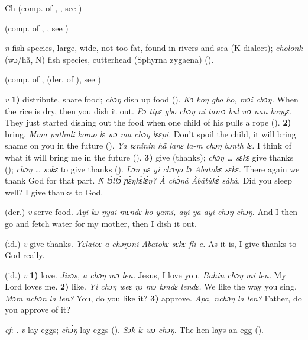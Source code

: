 \begin{letter}{Ch}
 (comp. of , , see ) 

 (comp. of , , see )

 \textit{n} fish species, large, wide, not too fat, found in rivers and sea (K dialect); \textit{cholonk} (wɔ/hã, N) fish species, cutterhead (Sphyrna zygaena) (\citealt{Pichl1967}). 

 (comp. of ,  (der. of ), see ) 

 \textit{v} \textbf{1)} distribute, share food; \textit{chɔŋ} dish up food (\citealt{Pichl1967}). \textit{Kɔ koŋ gbo ho, mɔi chɔŋ.} When the rice is dry, then you dish it out. \textit{Pɔ tipɛ gbo chɔŋ ni tamɔ bul wɔ nan baŋgɛ.} They just started dishing out the food when one child of his pulls a rope (\citealt{Sumner1921}). \textbf{2)} bring. \textit{Mma puthuli komo lɛ wɔ ma chɔŋ lɛɛpi.} Don't spoil the child, it will bring shame on you in the future (\citealt{Pichl1967}). \textit{Ya tɛninin hã lanɛ la-m chɔŋ bɔnth lɛ.} I think of what it will bring me in the future (\citealt{Pichl1967}). \textbf{3)} give (thanks);  \textit{chɔŋ … sɛkɛ} give thanks  (\citealt{Pichl1967}); \textit{chɔŋ … səkɛ} to give thanks (\citealt{Pichl1967}). \textit{Lɔn pɛ yi chɔŋo lɔ Abatokɛ sɛkɛ.} There again we thank God for that part. \textit{Ǹ lɔ̀llɔ́ ɲɛ̀ŋkɛ̀lɛ́ŋ? À chɔ̀ŋá Àbátùkɛ́ sàkà.} Did you sleep well? I give thanks to God.

 (der.) \textit{v} serve food. \textit{Ayi kɔ ŋyai mɛndɛ ko yami, ayi ya ayi chɔŋ-chɔŋ.} And I then go and fetch water for my mother, then I dish it out.

 (id.) \textit{v} give thanks. \textit{Yɛlaioɛ a chɔŋɔni Abatokɛ sɛkɛ fli e.} As it is, I give thanks to God really.

 (id.) \textit{v} \textbf{1)} love. \textit{Jizɔs, a chɔŋ mɔ len.} Jesus, I love you. \textit{Bahin chɔŋ mi len.} My Lord loves me. \textbf{2)} like. \textit{Yi chɔŋ weɛ ŋɔ mɔ tɔndɛ lendɛ.} We like the way you sing. \textit{Mɔm nchɔn la len?} You, do you like it? \textbf{3)} approve. \textit{Apa, nchɔŋ la len?} Father, do you approve of it?

 \textit{cf}: . \textit{v} lay eggs; \textit{chɔ́ŋ} lay eggs (\citealt{Sumner1921}). \textit{Sɔk lɛ wɔ chɔŋ.} The hen lays an egg (\citealt{Pichl1967}). 


\end{letter}
